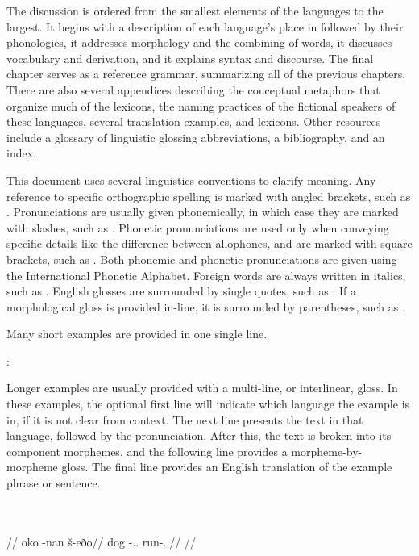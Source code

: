 The discussion is ordered from the smallest elements of the languages to the largest. It begins with a description of each language's place in \landn{} followed by their phonologies, it addresses morphology and the combining of words, it discusses vocabulary and derivation, and it explains syntax and discourse. The final chapter serves as a reference grammar, summarizing all of the previous chapters. There are also several appendices describing the conceptual metaphors that organize much of the lexicons, the naming practices of the fictional speakers of these languages, several translation examples, and lexicons. Other resources include a glossary of linguistic glossing abbreviations, a bibliography, and an index.

This document uses several linguistics conventions to clarify meaning. Any reference to specific orthographic spelling is marked with angled brackets, such as . Pronunciations are usually given phonemically, in which case they are marked with slashes, such as . Phonetic pronunciations are used only when conveying specific details like the difference between allophones, and are marked with square brackets, such as . Both phonemic and phonetic pronunciations are given using the International Phonetic Alphabet. Foreign words are always written in italics, such as . English glosses are surrounded by single quotes, such as . If a morphological gloss is provided in-line, it is surrounded by parentheses, such as \gloss{\Inf}.

Many short examples are provided in one single line.

	\langtvk:    
\xe

Longer examples are usually provided with a multi-line, or interlinear, gloss. In these examples, the optional first line will indicate which language the example is in, if it is not clear from context. The next line presents the text in that language, followed by the pronunciation. After this, the text is broken into its component morphemes, and the following line provides a morpheme-by-morpheme gloss. The final line provides an English translation of the example phrase or sentence.

	\begingl
		\glpreamble \langtvk\\
		\\
		//
		\gla oko -nan š-eðo//
		\glb dog -\Pl.\An.\Top{} run-\Ind.\Pst.\Prg//
		\glft {}//
	\endgl
\xe

